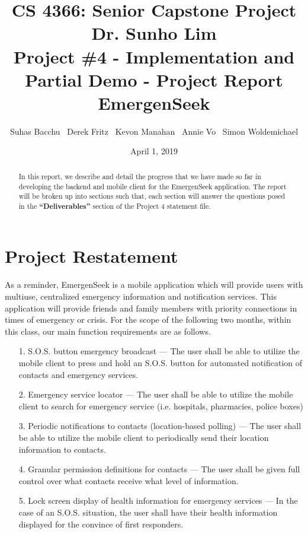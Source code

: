 \documentclass[10pt, a4paper]{article}
\title{\large CS 4366: Senior Capstone Project \\ Dr. Sunho Lim \\ Project \#4 - Implementation and Partial Demo - Project Report \\ EmergenSeek}
\author{Suhas Bacchu \ Derek Fritz \ Kevon Manahan \ Annie Vo \ Simon Woldemichael}
\date{April 1, 2019}
\begin{document}
\maketitle
\vspace{-1cm}
\begin{abstract}
In this report, we describe and detail the progress that we have made so far in developing the backend and mobile client for the EmergenSeek application. The report will be broken up into sections such that, each section will answer the questions posed in the \textbf{``Deliverables''} section of the Project 4 statement file.
\end{abstract}

\section{Project Restatement} 
\label{sec:pr}
As a reminder, EmergenSeek is a mobile application which will provide users with multiuse, centralized emergency information and notification services. This application will provide friends and family members with priority connections in times of emergency or crisis. For the scope of the following two months, within this class, our main function requirements are as follows.
\begin{enumerate}
	\item[1.] S.O.S. button emergency broadcast --- The user shall be able to utilize the mobile client to press and hold an S.O.S. button for automated notification of contacts and emergency services.
	\item[2.] Emergency service locator --- The user shall be able to utilize the mobile client to search for emergency service (i.e. hospitals, pharmacies, police boxes)
	\item[3.] Periodic notifications to contacts (location-based polling) --- The user shall be able to utilize the mobile client to periodically send their location information to contacts.
	\item[4.] Granular permission definitions for contacts --- The user shall be given full control over what contacts receive what level of information.
	\item[5.] Lock screen display of health information for emergency services --- In the case of an S.O.S. situation, the user shall have their health information displayed for the convince of first responders.
\end{enumerate}
\end{document}
